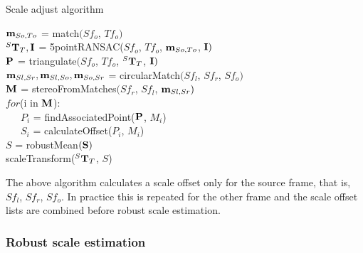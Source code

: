 \begin{algorithm}[h!]
 \caption{Scale adjust algorithm}
 $\mathbf{m}_{So, To}$ = match$(Sf_o$, $Tf_o)$ \\ 
\vspace{0.3em}
 $^S \mathbf{T}_T, \mathbf{I}$ = 5pointRANSAC($Sf_o$, $Tf_o$, $\mathbf{m}_{So, To}$, $\mathbf{I})$ \\
\vspace{0.3em}
 $\mathbf{P}$ = triangulate$(Sf_o$, $Tf_o$, $^S \mathbf{T}_T$, $\mathbf{I})$\\
\vspace{0.3em}
 $\mathbf m_{Sl,Sr},\mathbf m_{Sl,So},\mathbf m_{So,Sr}$ = circularMatch$(Sf_{l}$, $Sf_r$, $Sf_o)$ \\
\vspace{0.3em}
 $\mathbf{M}$ = stereoFromMatches$(Sf_r$, $Sf_l$, $\mathbf m_{Sl, Sr})$ \\
\vspace{0.3em}
 $for$(i in $\mathbf{M}$): \\
\vspace{0.3em}
 \ \ \ $P_i$ = findAssociatedPoint($\mathbf{P}$, ${M}_i$) \\
\vspace{0.3em}
 \ \ \ ${S}_i$ = calculateOffset(${P}_i$, ${M}_i$) \\
\vspace{0.3em}
 $S$ = robustMean$(\mathbf{S})$ \\
\vspace{0.3em}
 scaleTransform($^S \mathbf{T}_T$, $S$) \\
\vspace{0.3em}
\hspace{1em} 
\end{algorithm}

The above algorithm calculates a scale offset only for the source frame, that is, $Sf_{l}$, $Sf_r$, $Sf_o$.  In practice this is repeated for the other frame and the scale offset lists are combined before robust scale estimation.


\subsubsection{Robust scale estimation}

